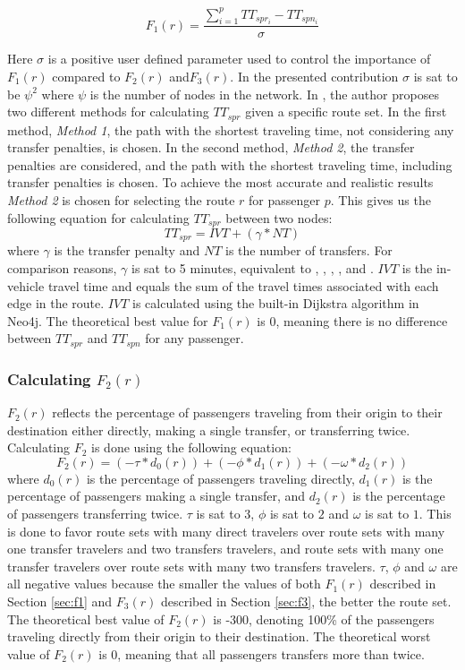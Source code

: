 $$F_{1}(r) = \frac{\sum\limits^{p}_{i=1}TT_{spr_i}-TT_{spn_i}}{\sigma}$$

Here $\sigma$ is a positive user defined parameter used to control the importance of $F_{1}(r)$ compared to $F_{2}(r)$ and$F_{3}(r)$. In the presented contribution $\sigma$ is sat to be $\psi^2$ where $\psi$ is the number of nodes in the network. In \citet{mandl79}, the author proposes two different methods for calculating $TT_{spr}$ given a specific route set. In the first method, \textit{Method 1}, the path with the shortest traveling time, not considering any transfer penalties, is chosen. In the second method, \textit{Method 2}, the transfer penalties are considered, and the path with the shortest traveling time, including transfer penalties is chosen. To achieve the most accurate and realistic results \textit{Method 2} is chosen for selecting the route $r$ for passenger $p$. This gives us the following equation for calculating $TT_{spr}$ between two nodes: 
\newline
$$TT_{spr} = IVT + (\gamma*NT)$$
\newline
where $\gamma$ is the transfer penalty and $NT$ is the number of transfers. For comparison reasons, $\gamma$ is sat to 5 minutes, equivalent to \citet{kechagiopoulos14}, \citet{baaj91}, \citet{chakroborty02}, \citet{nikolic14}, \citet{fan10} and \citet{mandl79}. $IVT$ is the in-vehicle travel time and equals the sum of the travel times associated with each edge in the route. $IVT$ is calculated using the built-in Dijkstra algorithm in Neo4j. The theoretical best value for $F_{1}(r)$ is 0, meaning there is no difference between $TT_{spr}$ and $TT_{spn}$ for any passenger.

\subsubsection{Calculating $F_{2}(r)$}
\label{sec:f2}
$F_{2}(r)$ reflects the percentage of passengers traveling from their origin to their destination either directly, making a single transfer, or transferring twice. Calculating $F_{2}$ is done using the following equation: 
\newline
$$F_2(r) = (-\tau*d_0(r)) + (-\phi*d_1(r)) + (-\omega*d_2(r))$$
\newline
where $d_0(r)$ is the percentage of passengers traveling directly, $d_1(r)$ is the percentage of passengers making a single transfer, and $d_2(r)$ is the percentage of passengers transferring twice. $\tau$ is sat to $3$, $\phi$ is sat to $2$ and $\omega$ is sat to $1$. This is done to favor route sets with many direct travelers over route sets with many one transfer travelers and two transfers travelers, and route sets with many one transfer travelers over route sets with many two transfers travelers. $\tau$, $\phi$ and $\omega$ are all negative values because the smaller the values of both $F_{1}(r)$ described in Section \vref{sec:f1} and $F_{3}(r)$ described in Section \vref{sec:f3}, the better the route set. The theoretical best value of $F_{2}(r)$ is -300, denoting 100\% of the passengers traveling directly from their origin to their destination. The theoretical worst value of $F_{2}(r)$ is 0, meaning that all passengers transfers more than twice. 

